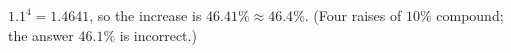 $1.1^4=1.4641$, so the increase is $46.41\%\approx\boxed{46.4\%}$. (Four raises of $10\%$ compound; the answer $46.1\%$ is incorrect.)
